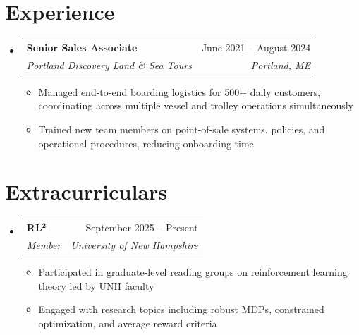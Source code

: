 \documentclass[letterpaper,11pt]{article}
\makeatletter
\newcommand{\resumeItem}[1]{
  \item\small{
    {#1 \vspace{-2pt}}
  }
}
\newcommand{\resumeSubheading}[4]{
  \vspace{-2pt}\item
    \begin{tabular*}{0.97\textwidth}[t]{l@{\extracolsep{\fill}}r}
      \textbf{#1} & #2 \\
      \textit{\small#3} & \textit{\small #4} \\
    \end{tabular*}\vspace{-7pt}
}
\newcommand{\resumeSubSubheading}[2]{
    \item
    \begin{tabular*}{0.97\textwidth}{l@{\extracolsep{\fill}}r}
      \textit{\small#1} & \textit{\small #2} \\
    \end{tabular*}\vspace{-7pt}
}
\newcommand{\resumeSubHeadingListStart}{\begin{itemize}[leftmargin=0.15in, label={}]}
\newcommand{\resumeSubHeadingListEnd}{\end{itemize}}
\newcommand{\resumeItemListStart}{\begin{itemize}}
\newcommand{\resumeItemListEnd}{\end{itemize}\vspace{-5pt}}
\makeatother
\begin{document}
  \section{Experience}
    \resumeSubHeadingListStart
      \resumeSubheading
        {Senior Sales Associate}{June 2021 -- August 2024}
        {Portland Discovery Land \& Sea Tours}{Portland, ME}
        \resumeItemListStart
          \resumeItem{Managed end-to-end boarding logistics for 500+ daily customers, coordinating across multiple vessel and trolley operations simultaneously}
          \resumeItem{Trained new team members on point-of-sale systems, policies, and operational procedures, reducing onboarding time}
        \resumeItemListEnd
    \resumeSubHeadingListEnd
      

  \section{Extracurriculars}
    \resumeSubHeadingListStart
        \resumeSubheading{RL$\mathbf{^2}$}{September 2025 -- Present}{Member}{University of New Hampshire}
            \resumeItemListStart
                \resumeItem{Participated in graduate-level reading groups on reinforcement learning theory led by UNH faculty}
                \resumeItem{Engaged with research topics including robust MDPs, constrained optimization, and average reward criteria}
            \resumeItemListEnd
    \resumeSubHeadingListEnd

\end{document}
